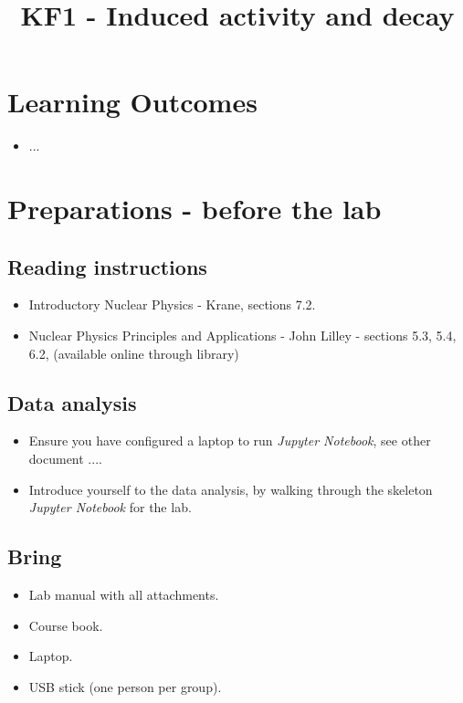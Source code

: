 \documentclass[12pt]{article}
\title{KF1 - Induced activity and decay}
\begin{document}
\maketitle
\newpage

\renewcommand*\contentsname{Table of contents}
\tableofcontents
\newpage

\section{Learning Outcomes}
\begin{itemize}
    \item ...
\end{itemize}

\section{Preparations - before the lab}

\subsection{Reading instructions}
\begin{itemize}
    \item Introductory Nuclear Physics - Krane, sections 7.2.
    \item Nuclear Physics Principles and Applications - John Lilley - sections 5.3, 5.4, 6.2, (available online through library)
\end{itemize}

\subsection{Data analysis}
\begin{itemize}
    \item Ensure you have configured a laptop to run {\it Jupyter Notebook}, see other document ....
    \item Introduce yourself to the data analysis, by walking through the skeleton {\it Jupyter Notebook} for the lab.
\end{itemize}

\subsection{Bring}
\begin{itemize}
    \item Lab manual with all attachments.
    \item Course book.
    \item Laptop.
    \item USB stick (one person per group).
\end{itemize}
\end{document}
